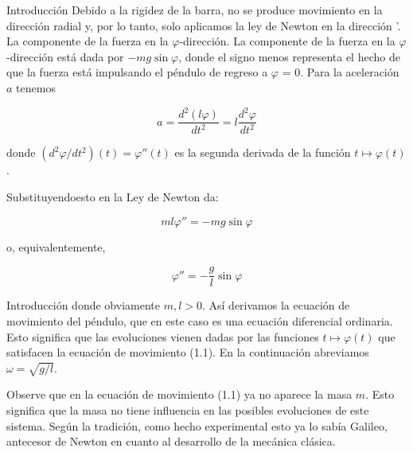 \documentclass[11pt]{beamer}
\begin{document}
\begin{frame}{Introducción}
			\justifying
Debido a la rigidez de la barra, no se produce movimiento en la dirección radial y, por lo tanto, solo aplicamos la ley de Newton en la dirección '. La componente de la fuerza en la $\varphi$-dirección. La componente de la fuerza en la $\varphi$-dirección está dada por $-mg \sin \varphi$, donde el signo menos representa el hecho de que la fuerza está impulsando el péndulo de regreso a $\varphi$ = 0. Para la aceleración $a$ tenemos

\[
a = \frac{d^2 (l \varphi)}{dt^2} = l \frac{d^2 \varphi}{dt^2}
\]

donde $(d^2 \varphi / dt^2)(t) = \varphi''(t)$ es la segunda derivada de la función $t \mapsto  \varphi(t)$.

Substituyendoesto en la Ley de Newton da:

\[
ml \varphi'' = -mg \sin \varphi
\]

o, equivalentemente,

\[
\varphi'' = - \frac{g}{l} \sin \varphi
\]

			
\end{frame}

\begin{frame}{Introducción}
			\justifying
donde obviamente $m, l > 0$. Así derivamos la ecuación de movimiento del péndulo, que en este caso es una ecuación diferencial ordinaria. Esto significa que las evoluciones vienen dadas por las funciones $t \mapsto  \varphi(t)$ que satisfacen la ecuación de movimiento (1.1). En la continuación abreviamos $\omega = \sqrt{g/l}$.	

\hfill

Observe que en la ecuación de movimiento (1.1) ya no aparece la masa $m$. Esto significa que la masa no tiene influencia en las posibles evoluciones de este sistema. Según la tradición, como hecho experimental esto ya lo sabía Galileo, antecesor de Newton en cuanto al desarrollo de la mecánica clásica.

		
\end{frame}
\end{document}
